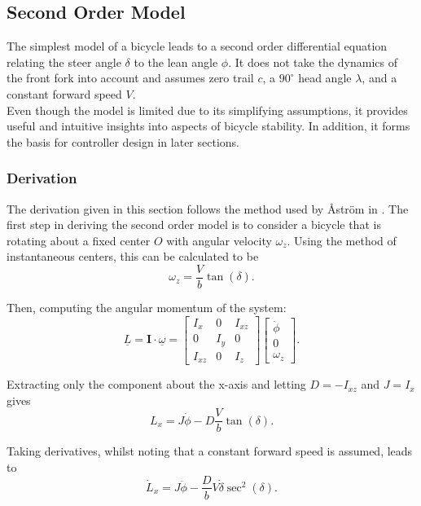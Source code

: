 \subsection{Second Order Model} \label{SecondOrder}
The simplest model of a bicycle leads to a second order differential equation relating the steer angle $\delta$ to the lean angle $\phi$. It does not take the dynamics of the front fork into account and assumes zero trail $c$, a $90^{\circ}$ head angle $\lambda$, and a constant forward speed $V$. \\

Even though the model is limited due to its simplifying assumptions, it provides useful and intuitive insights into aspects of bicycle stability. In addition, it forms the basis for controller design in later sections.

\subsubsection{Derivation}
The derivation given in this section follows the method used by {\AA}str{\"o}m in \cite{astrom}. The first step in deriving the second order model is to consider a bicycle that is rotating about a fixed center $O$ with angular velocity $\omega_z$. Using the method of instantaneous centers, this can be calculated to be
\begin{equation*}
\omega_z = \frac{V}{b} \tan{(\delta)}.
\end{equation*}

Then, computing the angular momentum of the system:
\begin{equation*}
\underline{L} = \mathbf{I} \cdot \underline{\omega} = \begin{bmatrix}
I_x & 0 & I_{xz} \\
0 & I_y & 0 \\
I_{xz} & 0 & I_z
\end{bmatrix} \begin{bmatrix}
\dot{\phi} \\
0 \\
\omega_z
\end{bmatrix}.
\end{equation*}

Extracting only the component about the x-axis and letting $D=-I_{xz}$ and $J=I_x$ gives
\begin{equation*}
L_x = J \dot{\phi} - D \frac{V}{b} \tan{(\delta)}.
\end{equation*}

Taking derivatives, whilst noting that a constant forward speed is assumed, leads to
\begin{equation*}
\dot{L}_x = J \ddot{\phi} - \frac{D}{b} V \dot{\delta} \sec^2{(\delta)}.
\end{equation*}

